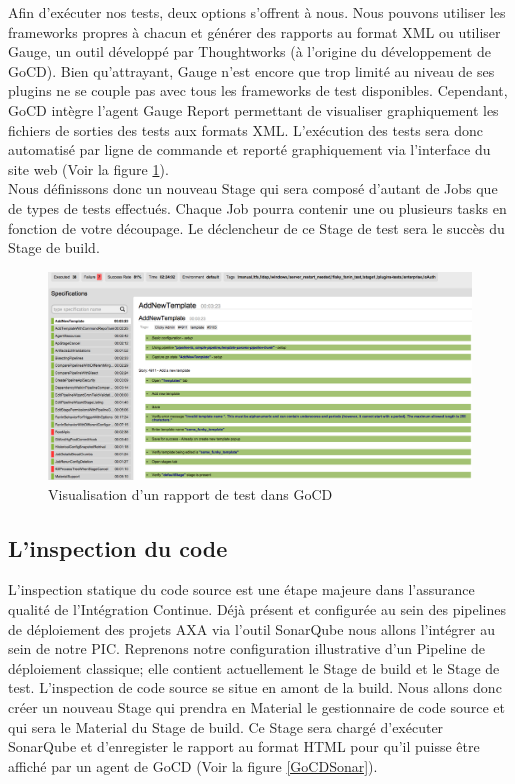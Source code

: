       Afin d'exécuter nos tests, deux options s'offrent à nous. Nous pouvons utiliser les frameworks propres à chacun et générer des rapports au format XML ou utiliser Gauge, un outil développé par Thoughtworks (à l'origine du développement de GoCD). Bien qu'attrayant, Gauge n'est encore que trop limité au niveau de ses plugins ne se couple pas avec tous les frameworks de test disponibles. Cependant, GoCD intègre l'agent Gauge Report permettant de visualiser graphiquement les fichiers de sorties des tests aux formats XML. L'exécution des tests sera donc automatisé par ligne de commande et reporté graphiquement via l'interface du site web (Voir la figure \ref{GoCDReportTest}).\\

      Nous définissons donc un nouveau Stage qui sera composé d'autant de Jobs que de types de tests effectués. Chaque Job pourra contenir une ou plusieurs tasks en fonction de votre découpage. Le déclencheur de ce Stage de test sera le succès du Stage de build.

      \begin{figure}
        \begin{center}
          \includegraphics[scale=0.15]{images/GoCDReportTest.png}
        \end{center}
        \caption{Visualisation d'un rapport de test dans GoCD}
        \label{GoCDReportTest}
      \end{figure}

      \subsection{L'inspection du code}
      L'inspection statique du code source est une étape majeure dans l'assurance qualité de l'Intégration Continue. Déjà présent et configurée au sein des pipelines de déploiement des projets AXA via l'outil SonarQube nous allons l'intégrer au sein de notre PIC. Reprenons notre configuration illustrative d'un Pipeline de déploiement classique; elle contient actuellement le Stage de build et le Stage de test. L'inspection de code source se situe en amont de la build. Nous allons donc créer un nouveau Stage qui prendra en Material le gestionnaire de code source et qui sera le Material du Stage de build. Ce Stage sera chargé d'exécuter SonarQube et d'enregister le rapport au format HTML pour qu'il puisse être affiché par un agent de GoCD (Voir la figure \ref{GoCDSonar}).\\

